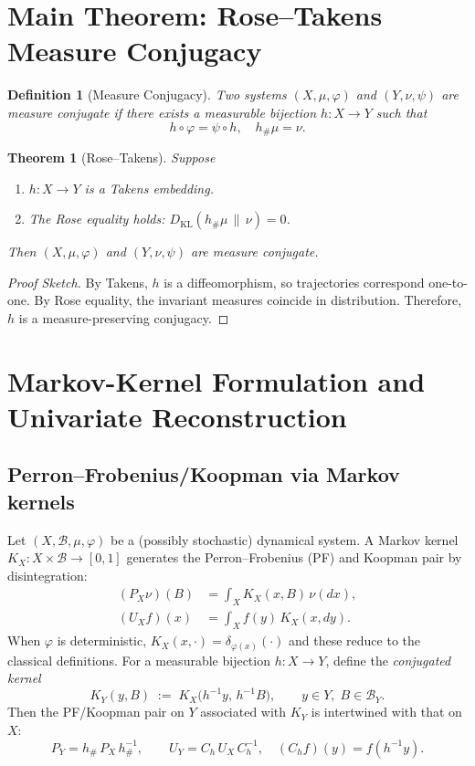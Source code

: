 \documentclass[11pt]{article}
\newtheorem{theorem}{Theorem}
\newtheorem{definition}{Definition}
\begin{document}
\section{Main Theorem: Rose--Takens Measure Conjugacy}
\begin{definition}[Measure Conjugacy]
Two systems $(X, \mu, \varphi)$ and $(Y, \nu, \psi)$ are \emph{measure conjugate} if there exists a measurable bijection $h: X \to Y$ such that
\[
  h \circ \varphi = \psi \circ h, \quad h_{\#}\mu = \nu.
\]
\end{definition}

\begin{theorem}[Rose--Takens]
Suppose 
\begin{enumerate}
  \item $h: X \to Y$ is a Takens embedding.
  \item The Rose equality holds: $D_{\mathrm{KL}}(h_{\#}\mu \,\|\, \nu) = 0$.
\end{enumerate}
Then $(X, \mu, \varphi)$ and $(Y, \nu, \psi)$ are measure conjugate.
\end{theorem}

\begin{proof}[Proof Sketch]
By Takens, $h$ is a diffeomorphism, so trajectories correspond one-to-one. By Rose equality, the invariant measures coincide in distribution. Therefore, $h$ is a measure-preserving conjugacy.
\end{proof}

\section{Markov-Kernel Formulation and Univariate Reconstruction}\label{sec:kernel}
\subsection{Perron--Frobenius/Koopman via Markov kernels}
Let $(X,\mathcal B,\mu,\varphi)$ be a (possibly stochastic) dynamical system. A Markov kernel $K_X:X\times\mathcal B\to[0,1]$ generates the Perron--Frobenius (PF) and Koopman pair by disintegration:
\begin{align}
  (P_X\nu)(B) &= \int_X K_X(x,B)\,\nu(dx),\\
  (U_X f)(x) &= \int_X f(y)\,K_X(x,dy).
\end{align}
When $\varphi$ is deterministic, $K_X(x,\cdot)=\delta_{\varphi(x)}(\cdot)$ and these reduce to the classical definitions. For a measurable bijection $h:X\to Y$, define the \emph{conjugated kernel}
\begin{equation}
  K_Y(y,B) \;:=\; K_X\big(h^{-1}y,\, h^{-1}B\big),\qquad y\in Y,\;B\in\mathcal B_Y.
\end{equation}
Then the PF/Koopman pair on $Y$ associated with $K_Y$ is intertwined with that on $X$:
\begin{equation}
  P_Y = h_{\#}\,P_X\,h_{\#}^{-1},\qquad U_Y = C_h\,U_X\,C_h^{-1},\quad (C_h f)(y)=f(h^{-1}y).
\end{equation}
\end{document}
